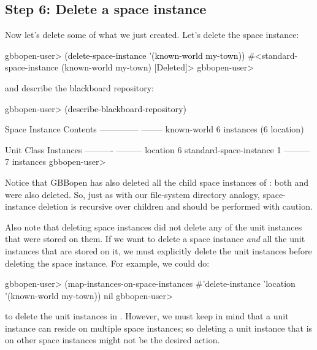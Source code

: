 \documentclass[10pt,twoside,english,pdftex]{article}
\begin{document}
\subsection*{Step 6: Delete a space instance}

%
%
%
Now let's delete some of what we just created.  Let's delete the
 space instance:
%
\W\supp
\begin{example}
\textcolor{darkergray}{%
  gbbopen-user> \textcolor{black}{(delete-space-instance '(known-world my-town))}
  #<standard-space-instance (known-world my-town) [Deleted]>
  gbbopen-user>}
\end{example}
%
%
and describe the blackboard repository:
%
\W\supp\notpretop
\begin{example}
\textcolor{darkergray}{%
  gbbopen-user> \textcolor{black}{(describe-blackboard-repository)}

  Space Instance                Contents
  --------------                --------
  known-world                   6 instances (6 location)

  Unit Class                    Instances
  ----------                    ---------
  location                              6
  standard-space-instance               1
                                ---------
                                        7 instances
  gbbopen-user>}
\end{example}
%
Notice that GBBopen has also deleted all the child space instances of
: both  and  were also deleted.
So, just as with our file-system directory analogy, space-instance deletion is
recursive over children and should be performed with caution.  

%
%
%
Also note that deleting space instances did not delete any of the unit
instances that were stored on them.  If we want to delete a space instance
\textit{and\/} all the unit instances that are stored on it, we must
explicitly delete the unit instances before deleting the space instance.
For example, we could do:
%
\W\supp
\begin{example}
\textcolor{darkergray}{%
  gbbopen-user> (map-instances-on-space-instances #'delete-instance 
                  'location '(known-world my-town))
  nil
  gbbopen-user>}
\end{example}
%
to delete the unit instances in .  However, we must keep in mind
that a unit instance can reside on multiple space instances; so deleting a
unit instance that is on other space instances might not be the desired
action.
\end{document}
